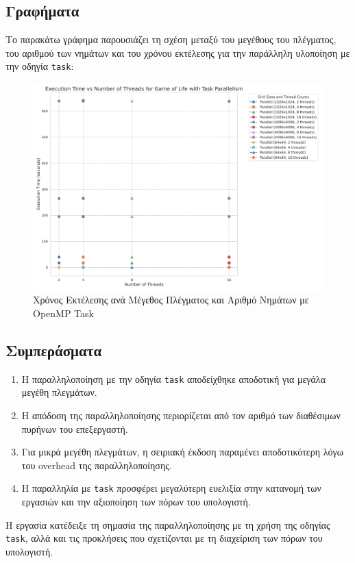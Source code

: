 \documentclass{article}
\begin{document}
\subsection*{Γραφήματα} 
Το παρακάτω γράφημα παρουσιάζει τη σχέση μεταξύ του μεγέθους του πλέγματος, του αριθμού των νημάτων και του χρόνου εκτέλεσης για την παράλληλη υλοποίηση με την οδηγία \texttt{task}: 
\begin{figure}[h] 
    \centering 
    \includegraphics[width=1\textwidth]{game_of_life_tasks_results.png} 
    \caption{Χρόνος Εκτέλεσης ανά Μέγεθος Πλέγματος και Αριθμό Νημάτων με OpenMP Task} 
\end{figure}
\subsection*{Συμπεράσματα} 
\begin{enumerate} 
    \item Η παραλληλοποίηση με την οδηγία \texttt{task} αποδείχθηκε αποδοτική για μεγάλα μεγέθη πλεγμάτων. 
    \item Η απόδοση της παραλληλοποίησης περιορίζεται από τον αριθμό των διαθέσιμων πυρήνων του επεξεργαστή. 
    \item Για μικρά μεγέθη πλεγμάτων, η σειριακή έκδοση παραμένει αποδοτικότερη λόγω του overhead της παραλληλοποίησης. 
    \item Η παραλληλία με \texttt{task} προσφέρει μεγαλύτερη ευελιξία στην κατανομή των εργασιών και την αξιοποίηση των πόρων του υπολογιστή. 
\end{enumerate}
Η εργασία κατέδειξε τη σημασία της παραλληλοποίησης με τη χρήση της οδηγίας \texttt{task}, αλλά και τις προκλήσεις που σχετίζονται με τη διαχείριση των πόρων του υπολογιστή.
\end{document}
